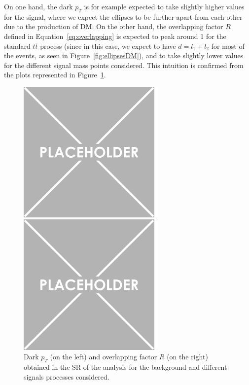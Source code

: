 \documentclass[a4paper, 10pt, openright]{report}
\begin{document}
On one hand, the dark $p_T$ is for example expected to take slightly higher values for the signal, where we expect the ellipses to be further apart from each other due to the production of \ac{DM}. On the other hand, the overlapping factor $R$ defined in Equation~\ref{eq:overlapping} is expected to peak around 1 for the standard $t \bar t$ process (since in this case, we expect to have $d = l_1 + l_2$ for most of the events, as seen in Figure~\ref{fig:ellipsesDM}), and to take slightly lower values for the different signal mass points considered. This intuition is confirmed from the plots represented in Figure~\ref{fig:SRdisc1}.

\begin{figure}[htbp]
\centering
\begin{minipage}[b]{.48\textwidth}
\includegraphics[width=7cm, height=7cm]{figs/placeholder.png}
\end{minipage}\hfill
\begin{minipage}[b]{.48\textwidth}
\includegraphics[width=7cm, height=7cm]{figs/placeholder.png}
\end{minipage} \hfill
\caption{Dark $p_T$ (on the left) and overlapping factor $R$ (on the right) obtained in the \ac{SR} of the analysis for the background and different signals processes considered.}
\label{fig:SRdisc1}
\end{figure}
\end{document}
